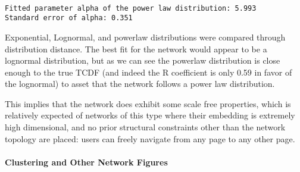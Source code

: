 \documentclass[11pt]{article}
\begin{document}
    \begin{center}
    \end{center}
    { \hspace*{\fill} \\}
    
    \begin{Verbatim}[commandchars=\\\{\}]
Fitted parameter alpha of the power law distribution: 5.993
Standard error of alpha: 0.351

    \end{Verbatim}

    Exponential, Lognormal, and powerlaw distributions were compared through
distribution distance. The best fit for the network would appear to be a
lognormal distribution, but as we can see the powerlaw distribution is
close enough to the true TCDF (and indeed the R coefficient is only 0.59
in favor of the lognormal) to asset that the network follows a power law
distribution.

This implies that the network does exhibit some scale free properties,
which is relatively expected of networks of this type where their
embedding is extremely high dimensional, and no prior structural
constraints other than the network topology are placed: users can freely
navigate from any page to any other page.

    \paragraph{Clustering and Other Network
Figures}\label{clustering-and-other-network-figures}
\end{document}
